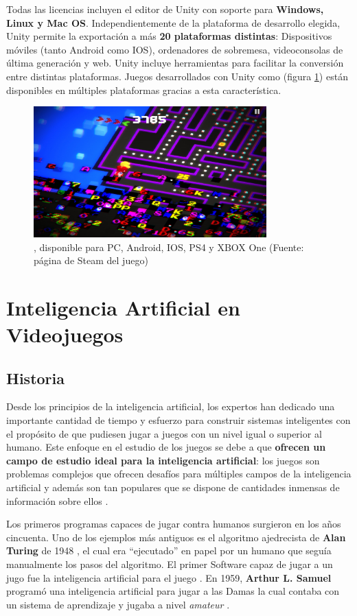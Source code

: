 Todas las licencias incluyen el editor de Unity con soporte para \textbf{Windows, Linux y Mac OS}. Independientemente de la plataforma de desarrollo elegida, Unity permite la exportación a más \textbf{20 plataformas distintas}: Dispositivos móviles (tanto Android como IOS), ordenadores de sobremesa, videoconsolas de última generación y web. Unity incluye herramientas para facilitar la conversión entre distintas plataformas. Juegos desarrollados con Unity como  (figura \ref{pacman-256}) están disponibles en múltiples plataformas gracias a esta característica.
\begin{figure}[h]
	\includegraphics[width=0.8\textwidth]{images/estadodelarte/motores/pacman-256}
	\centering
	\caption{, disponible para PC, Android, IOS, PS4 y XBOX One (Fuente: página de Steam del juego)}
	\label{pacman-256}
\end{figure}

\section{Inteligencia Artificial en Videojuegos}
\subsection{Historia}
Desde los principios de la inteligencia artificial, los expertos han dedicado una importante cantidad de tiempo y esfuerzo para construir sistemas inteligentes con el propósito de que pudiesen jugar a juegos con un nivel igual o superior al humano. Este enfoque en el estudio de los juegos se debe a que \textbf{ofrecen un campo de estudio ideal para la inteligencia artificial}: los juegos son problemas complejos que ofrecen desafíos para múltiples campos de la inteligencia artificial y además son tan populares que se dispone de cantidades inmensas de información sobre ellos \cite{ai_and_games}.

Los primeros programas capaces de jugar contra humanos surgieron en los años cincuenta. Uno de los ejemplos más antiguos es el algoritmo ajedrecista de \textbf{Alan Turing} de 1948 \cite{turing_chess}, el cual era ``ejecutado'' en papel por un humano que seguía manualmente los pasos del algoritmo. El primer Software capaz de jugar a un jugo fue la inteligencia artificial para el juego . En 1959, \textbf{Arthur L. Samuel} \cite{machine_learning} programó una inteligencia artificial para jugar a las Damas la cual contaba con un sistema de aprendizaje y jugaba a nivel \textit{amateur} \cite{ia_moderno}. 

